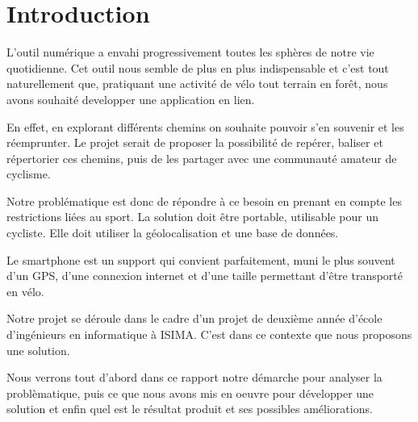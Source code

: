 \section{Introduction}

L'outil numérique a envahi progressivement toutes les sphères de notre vie quotidienne. Cet outil nous semble de
plus en plus indispensable et c'est tout naturellement que, pratiquant une activité de vélo tout terrain en forêt,
nous avons souhaité developper une application en lien.

En effet, en explorant différents chemins on souhaite pouvoir s'en souvenir et les réemprunter. Le projet serait de
proposer la possibilité de repérer, baliser et répertorier ces chemins, puis de les partager avec une communauté
amateur de cyclisme.

Notre problématique est donc de répondre à ce besoin en prenant en compte les restrictions liées au sport. La
solution doit être portable, utilisable pour un cycliste. Elle doit utiliser la géolocalisation et une base de données.

Le smartphone est un support qui convient parfaitement, muni le plus souvent d'un GPS, d'une connexion internet
et d'une taille permettant d'être transporté en vélo.

Notre projet se déroule dans le cadre d'un projet de deuxième année d'école d'ingénieurs en informatique à ISIMA. C'est
dans ce contexte que nous proposons une solution.

Nous verrons tout d'abord dans ce rapport notre démarche pour analyser la problèmatique, puis ce que nous avons mis
en oeuvre pour développer une solution et enfin quel est le résultat produit et ses possibles améliorations.